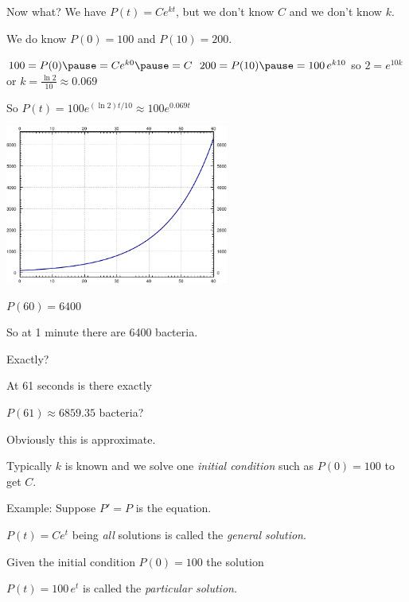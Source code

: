 \documentclass[10pt,aspectratio=169]{beamer}
\begin{document}
\begin{frame}

Now what?  We have $P(t) = C e^{kt}$, but we don't know $C$ and we don't know $k$.

\medskip
\pause

We do know $P(0)=100$ and $P(10)=200$.

\medskip
\pause

$100 = P(0) \pause = C e^{k0} \pause = C$
\pause
\qquad
$200 = P(10) \pause = 100 \, e^{k10}$
\qquad
so
\quad
$2 = e^{10k}$ \pause or $k = \frac{\ln 2}{10} \approx 0.069$ 

\medskip
\pause

So
\quad
$P(t)=100e^{(\ln 2)t/10} \approx 100e^{0.069 t}$

\pause

\vspace*{-0.2in}

\hspace*{2.5in}
\includegraphics[height=2.05in]{../figures/intro-plotbact}

\vspace*{-1.8in}
\pause

$P(60) = 6400$

\pause

So at 1 minute there are 6400 bacteria.

\pause
\medskip

Exactly?

\pause
\medskip

At 61 seconds is there exactly

$P(61)\approx 6859.35$ bacteria?

\medskip
\pause

Obviously this is approximate.

\end{frame}

\begin{frame}

Typically $k$ is known and we solve one
\emph{initial condition} such as
$P(0)=100$ to get $C$.

\medskip
\pause

Example: Suppose $P' = P$ is the equation.

\medskip
\pause

$P(t) = C e^{t}$ \quad being \emph{all} solutions is called the
\emph{general solution}.

\medskip
\pause

Given the initial condition $P(0) = 100$ the solution

\medskip

$P(t) = 100 \, e^{t}$ \quad is called the \emph{particular solution}.

\end{frame}
\end{document}
